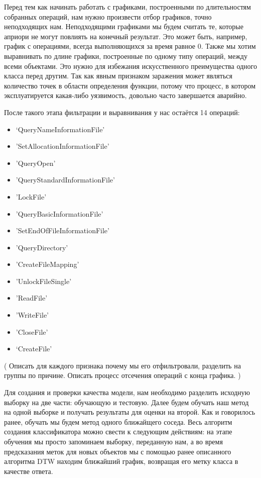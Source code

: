 Перед тем как начинать работать с графиками, построенными по длительностям собранных операций, нам нужно произвести отбор графиков, точно неподходящих нам. Неподходящими графиками мы будем считать те, которые априори не могут повлиять на конечный результат. Это может быть, например, график с операциями, всегда выполняющихся за время равное 0. Также мы хотим выравнивать по длине графики, построенные по одному типу операций, между всеми объектами. Это нужно для избежания искусственного преимущества одного класса перед другим. Так как явным признаком заражения может являться количество точек в области определения функции, потому что процесс, в котором эксплуатируется какая-либо уязвимость, довольно часто завершается аварийно. 

После такого этапа фильтрации и выравнивания у нас остаётся 14 операций:

\begin{itemize}
\item ‘QueryNameInformationFile'
\item 'SetAllocationInformationFile'
\item 'QueryOpen'
\item 'QueryStandardInformationFile'
\item 'LockFile'
\item 'QueryBasicInformationFile'
\item 'SetEndOfFileInformationFile'
\item 'QueryDirectory'
\item 'CreateFileMapping'
\item 'UnlockFileSingle'
\item 'ReadFile'
\item 'WriteFile'
\item 'CloseFile'
\item ‘CreateFile’
\end{itemize}

 ( Описать для каждого признака почему мы его отфильтровали, разделить на группы по причине. Описать процесс отсечения операций с конца графика. )

Для создания и проверки качества модели, нам необходимо разделить исходную выборку на две части: обучающую и тестовую. Далее будем обучать наш метод на одной выборке и получать результаты для оценки на второй. Как и говорилось ранее, обучать мы будем метод одного ближайщего соседа. Весь алгоритм создания классификатора можно свести к следующим действиям: на этапе обучения мы просто запоминаем выборку, переданную нам, а во время предсказания меток для новых объектов мы с помощью ранее описанного алгоритма DTW находим ближайший график, возвращая его метку класса в качестве ответа.

